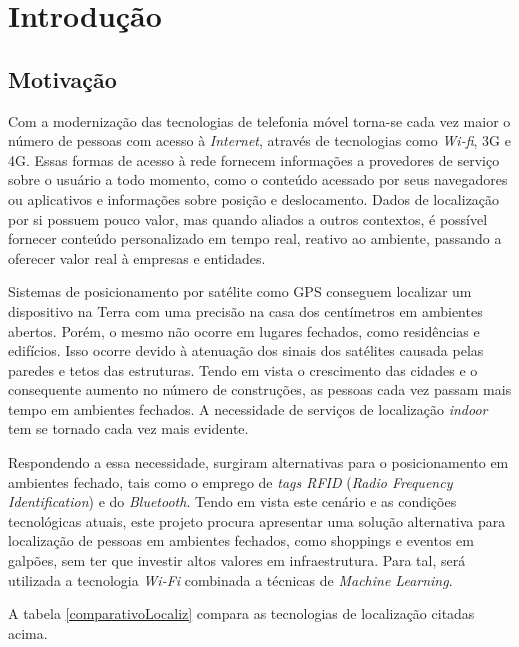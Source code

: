 \chapter{Introdução}\label{chp:introduction}

\section{Motivação}\label{sec:motivation}
Com a modernização das tecnologias de telefonia móvel torna-se cada vez maior o
número de pessoas com acesso à \textit{Internet}, através de tecnologias como \textit{Wi-fi}, 3G e 4G. Essas formas de acesso à rede fornecem informações a provedores de serviço sobre o usuário a todo momento, como o conteúdo acessado por seus navegadores ou aplicativos
e informações sobre posição e deslocamento. Dados de localização por si possuem
pouco valor, mas quando aliados a outros contextos, é possível fornecer conteúdo
personalizado em tempo real, reativo ao ambiente, passando a oferecer valor real à empresas e entidades.
\par
Sistemas de posicionamento por satélite como GPS conseguem localizar um dispositivo
na Terra com uma precisão na casa dos centímetros em ambientes abertos. Porém,
o mesmo não ocorre em lugares fechados, como residências e edifícios. Isso ocorre
devido à atenuação dos sinais dos satélites causada pelas paredes e tetos das
estruturas. Tendo em vista o crescimento das cidades e o consequente aumento no
número de construções, as pessoas cada vez passam mais tempo em ambientes
fechados. A necessidade de serviços de localização \textit{indoor} tem se tornado cada
vez mais evidente.
\par
Respondendo a essa necessidade, surgiram alternativas para o posicionamento em
ambientes fechado, tais como o emprego de \textit{tags RFID} (\textit{Radio Frequency Identification}) e do \textit{Bluetooth}. Tendo em vista este
cenário e as condições tecnológicas atuais, este projeto procura apresentar uma
solução alternativa para localização de pessoas em ambientes fechados, como shoppings e
eventos em galpões, sem ter que investir altos valores em infraestrutura. Para tal, será utilizada a tecnologia \textit{Wi-Fi} combinada a técnicas de \textit{Machine Learning}.
\par
A tabela \ref{comparativoLocaliz} compara as tecnologias de localização citadas acima.


